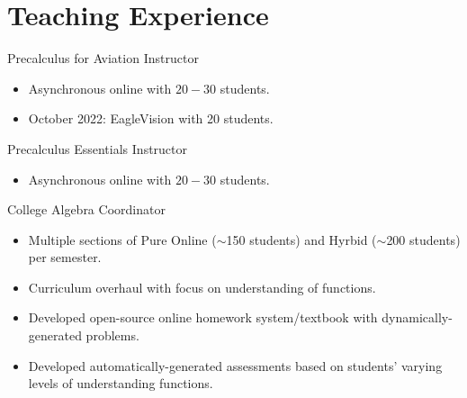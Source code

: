 \documentclass[10pt,a4paper,sans]{moderncv}
\begin{document}
\section{Teaching Experience} 
	{Precalculus for Aviation}
	{Instructor}{}{}
	{\begin{itemize}
			\item Asynchronous online with $20-30$ students.
			\item October 2022: EagleVision with 20 students.
		\end{itemize} }
	{Precalculus Essentials}
	{Instructor}{}{}
	{\begin{itemize}
			\item Asynchronous online with $20-30$ students.
	\end{itemize} }
{College Algebra}
{Coordinator}{}{}
{\begin{itemize}
		\item Multiple sections of Pure Online ($\sim$150 students) and Hyrbid ($\sim$200 students) per semester. 
		\item Curriculum overhaul with focus on understanding of functions.
		\item Developed open-source online homework system/textbook with dynamically-generated problems.
		\item Developed automatically-generated assessments based on students' varying levels of understanding functions.
\end{itemize}}
\end{document}
